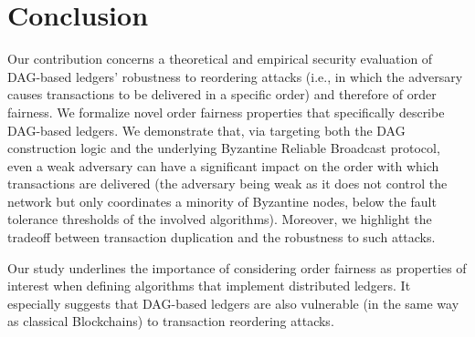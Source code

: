 

\section{Conclusion\label{sec:conc}}


Our contribution concerns a theoretical and empirical security evaluation of DAG-based ledgers' robustness to reordering attacks (i.e., in which the adversary causes transactions to be delivered in a specific order) and therefore of order fairness.
We formalize novel order fairness properties that specifically describe DAG-based ledgers.
We demonstrate that, via targeting both the DAG construction logic and the underlying Byzantine Reliable Broadcast protocol, even a weak adversary can have a significant impact on the order with which transactions are delivered
(the adversary being weak as it does not control the network but only coordinates a minority of Byzantine nodes, below the fault tolerance thresholds of the involved algorithms).
Moreover, we highlight the tradeoff between transaction duplication and the robustness to such attacks.

Our study underlines the importance of considering order fairness as properties of interest when defining algorithms that implement distributed ledgers. 
It especially suggests that DAG-based ledgers are also vulnerable (in the same way as classical Blockchains) to transaction reordering attacks.




